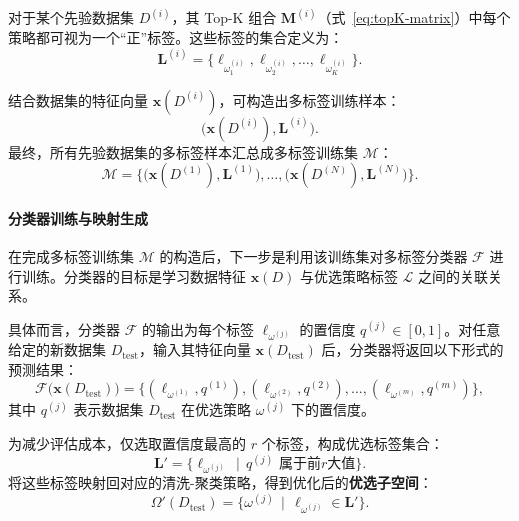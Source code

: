 \documentclass[10pt]{article} %
\numberwithin{equation}{section}
\begin{document}
对于某个先验数据集 $D^{(i)}$，其 Top-K 组合 $\mathbf{M}^{(i)}$（式~\eqref{eq:topK-matrix}）中每个策略都可视为一个“正”标签。这些标签的集合定义为：
\begin{equation}\label{eq:label-space-for-D}
\mathbf{L}^{(i)}
= \{\ell_{\omega_1^{(i)}}, \ell_{\omega_2^{(i)}}, \ldots, \ell_{\omega_K^{(i)}}\}.
\end{equation}

结合数据集的特征向量 $\mathbf{x}(D^{(i)})$，可构造出多标签训练样本：
\[
\bigl(\mathbf{x}(D^{(i)}), \mathbf{L}^{(i)}\bigr).
\]
最终，所有先验数据集的多标签样本汇总成多标签训练集 $\mathcal{M}$：
\begin{equation}\label{eq:training-set}
\mathcal{M}
= \bigl\{\bigl(\mathbf{x}(D^{(1)}), \mathbf{L}^{(1)}\bigr), \ldots, \bigl(\mathbf{x}(D^{(N)}), \mathbf{L}^{(N)}\bigr)\bigr\}.
\end{equation}

\paragraph{分类器训练与映射生成}  
在完成多标签训练集 $\mathcal{M}$ 的构造后，下一步是利用该训练集对多标签分类器 $\mathcal{F}$ 进行训练。分类器的目标是学习数据特征 $\mathbf{x}(D)$ 与优选策略标签 $\mathcal{L}$ 之间的关联关系。

具体而言，分类器 $\mathcal{F}$ 的输出为每个标签 $\ell_{\omega^{(j)}}$ 的置信度 $q^{(j)} \in [0,1]$。对任意给定的新数据集 $D_{\text{test}}$，输入其特征向量 $\mathbf{x}(D_{\text{test}})$ 后，分类器将返回以下形式的预测结果：
\begin{equation}\label{eq:classifier}
\mathcal{F}\bigl(\mathbf{x}(D_{\text{test}})\bigr)
= \bigl\{(\ell_{\omega^{(1)}}, q^{(1)}), (\ell_{\omega^{(2)}}, q^{(2)}), \ldots, (\ell_{\omega^{(m)}}, q^{(m)})\bigr\},
\end{equation}
其中 $q^{(j)}$ 表示数据集 $D_{\text{test}}$ 在优选策略 $\omega^{(j)}$ 下的置信度。

为减少评估成本，仅选取置信度最高的 $r$ 个标签，构成优选标签集合：
\begin{equation}\label{eq:predicted-label-space}
\mathbf{L}' = \bigl\{\ell_{\omega^{(j)}} \,\mid\, q^{(j)} \text{ 属于前}r\text{大值}\bigr\}.
\end{equation}
将这些标签映射回对应的清洗-聚类策略，得到优化后的\textbf{优选子空间}：
\begin{equation}\label{eq:optimized-space}
\Omega'(D_{\text{test}})
= \bigl\{\omega^{(j)} \,\mid\, \ell_{\omega^{(j)}} \in \mathbf{L}'\bigr\}.
\end{equation}
\end{document}
